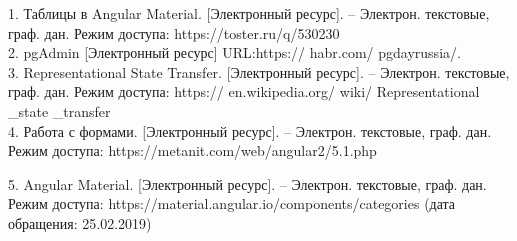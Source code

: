 \documentclass[a4paper]{article}
\begin{document}
\normalsize{1.	Таблицы в Angular Material. [Электронный ресурс]. – Электрон. текстовые, граф. дан. Режим доступа: https://toster.ru/q/530230
}\\


\normalsize{2. pgAdmin [Электронный ресурс] URL:https:// habr.com/ pgdayrussia/.
}\\


\normalsize{3.	Representational State Transfer. [Электронный ресурс]. – Электрон. текстовые, граф. дан. Режим доступа: https:// en.wikipedia.org/ wiki/ Representational \_state \_transfer
}\\


\normalsize{4.	Работа с формами. [Электронный ресурс]. – Электрон. текстовые, граф. дан. Режим доступа: https://metanit.com/web/angular2/5.1.php
}\\


\normalsize{5.	Angular Material. [Электронный ресурс]. – Электрон. текстовые, граф. дан. Режим доступа: https://material.angular.io/components/categories (дата обращения: 25.02.2019)

}\\
\end{document}
